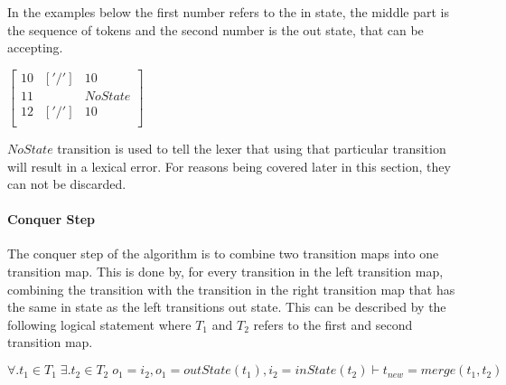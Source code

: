 In the
examples below the first number refers to the in state, the middle part is the
sequence of tokens and the second number is the out state, that can be accepting.
\begin{center}
$\left[\begin{array}{ccc}
10&['/']&10\\
11& &NoState\\
12&['/']&10\\
\end{array}\right]$
\end{center}
$NoState$ transition is used to tell the lexer that using that particular 
transition will result in a lexical error. For reasons being covered later in
this section, they can not be discarded.

\paragraph{Conquer Step}
The conquer step of the algorithm is to combine two transition maps into one
transition map. This is done by, for every transition in the left transition map, combining
the transition with the transition in the right transition map that has the same in state as the
left transitions out state. This can be described by the following logical statement where $T_1$ and $T_2$ refers to the first and second transition map.
\begin{center}
$\forall.t_1\in T_1\;\exists.t_2\in T_2\;o_1=i_2,o_1=outState(t_1),i_2=inState(t_2)
\vdash t_{new}=merge(t_1,t_2)$
\end{center}

